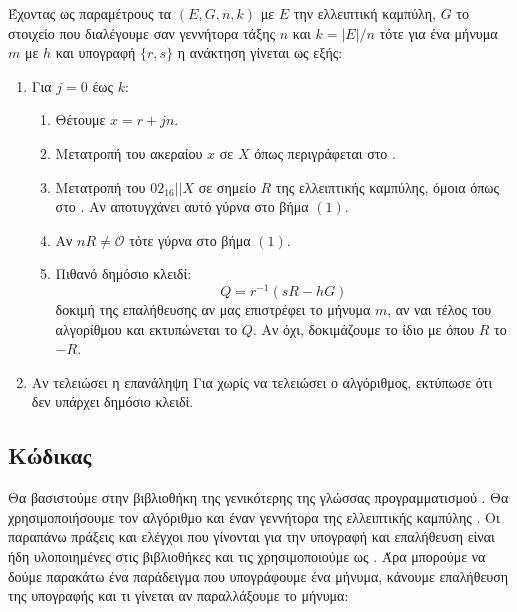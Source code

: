 \documentclass[oneside,a4paper]{article}
\begin{document}
Έχοντας ως παραμέτρους τα $(E,G,n,k)$  με $E$ την ελλειπτική καμπύλη, $G$ το στοιχείο που διαλέγουμε σαν γεννήτορα τάξης $n$ και $k = |E|/n$ τότε για ένα μήνυμα $m$ με  $h$ και υπογραφή $\{r,s\}$ η ανάκτηση γίνεται ως εξής:

\begin{enumerate}
	\item Για $j=0$ έως $k$:
	\begin{enumerate}
		\item Θέτουμε $x = r +jn$.
		\item Μετατροπή του ακεραίου $x$ σε  $X$ όπως περιγράφεται στο  \cite{sec1}. %
		\item Μετατροπή του  $02_{16}||X$ σε σημείο $R$ της ελλειπτικής καμπύλης, όμοια όπως στο \cite{sec1}. Αν αποτυγχάνει αυτό γύρνα στο βήμα $(1)$.
		\item Αν $nR\neq \mathcal{O}$ τότε γύρνα στο βήμα $(1)$.
		\item Πιθανό δημόσιο κλειδί:
		$$Q = r^{-1}(sR - hG)$$
		δοκιμή της επαλήθευσης αν μας επιστρέφει το μήνυμα $m$, αν ναι τέλος του αλγορίθμου και εκτυπώνεται το $Q$. Αν όχι, δοκιμάζουμε το ίδιο με όπου $R$ το $-R$.
	\end{enumerate}
	\item Αν τελειώσει η επανάληψη Για χωρίς να τελειώσει ο αλγόριθμος, εκτύπωσε ότι δεν υπάρχει δημόσιο κλειδί.
\end{enumerate}
\subsection{Κώδικας}
Θα βασιστούμε στην βιβλιοθήκη  της γενικότερης  της γλώσσας προγραμματισμού . Θα χρησιμοποιήσουμε τον αλγόριθμο  και έναν γεννήτορα της ελλειπτικής καμπύλης . Οι παραπάνω πράξεις και ελέγχοι που γίνονται για την υπογραφή και επαλήθευση είναι ήδη υλοποιημένες στις βιβλιοθήκες και τις χρησιμοποιούμε ως . Άρα μπορούμε να δούμε παρακάτω ένα παράδειγμα που υπογράφουμε ένα μήνυμα, κάνουμε επαλήθευση της υπογραφής και τι γίνεται αν παραλλάξουμε το μήνυμα:
\end{document}
